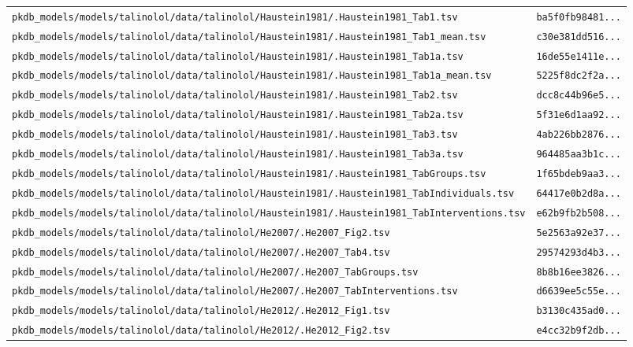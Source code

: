\documentclass{article}
\begin{document}
\begin{longtable}{ll}
\texttt{pkdb\_models/models/talinolol/data/talinolol/Haustein1981/.Haustein1981\_Tab1.tsv} & \texttt{ba5f0fb98481...} \\
\texttt{pkdb\_models/models/talinolol/data/talinolol/Haustein1981/.Haustein1981\_Tab1\_mean.tsv} & \texttt{c30e381dd516...} \\
\texttt{pkdb\_models/models/talinolol/data/talinolol/Haustein1981/.Haustein1981\_Tab1a.tsv} & \texttt{16de55e1411e...} \\
\texttt{pkdb\_models/models/talinolol/data/talinolol/Haustein1981/.Haustein1981\_Tab1a\_mean.tsv} & \texttt{5225f8dc2f2a...} \\
\texttt{pkdb\_models/models/talinolol/data/talinolol/Haustein1981/.Haustein1981\_Tab2.tsv} & \texttt{dcc8c44b96e5...} \\
\texttt{pkdb\_models/models/talinolol/data/talinolol/Haustein1981/.Haustein1981\_Tab2a.tsv} & \texttt{5f31e6d1aa92...} \\
\texttt{pkdb\_models/models/talinolol/data/talinolol/Haustein1981/.Haustein1981\_Tab3.tsv} & \texttt{4ab226bb2876...} \\
\texttt{pkdb\_models/models/talinolol/data/talinolol/Haustein1981/.Haustein1981\_Tab3a.tsv} & \texttt{964485aa3b1c...} \\
\texttt{pkdb\_models/models/talinolol/data/talinolol/Haustein1981/.Haustein1981\_TabGroups.tsv} & \texttt{1f65bdeb9aa3...} \\
\texttt{pkdb\_models/models/talinolol/data/talinolol/Haustein1981/.Haustein1981\_TabIndividuals.tsv} & \texttt{64417e0b2d8a...} \\
\texttt{pkdb\_models/models/talinolol/data/talinolol/Haustein1981/.Haustein1981\_TabInterventions.tsv} & \texttt{e62b9fb2b508...} \\
\texttt{pkdb\_models/models/talinolol/data/talinolol/He2007/.He2007\_Fig2.tsv} & \texttt{5e2563a92e37...} \\
\texttt{pkdb\_models/models/talinolol/data/talinolol/He2007/.He2007\_Tab4.tsv} & \texttt{29574293d4b3...} \\
\texttt{pkdb\_models/models/talinolol/data/talinolol/He2007/.He2007\_TabGroups.tsv} & \texttt{8b8b16ee3826...} \\
\texttt{pkdb\_models/models/talinolol/data/talinolol/He2007/.He2007\_TabInterventions.tsv} & \texttt{d6639ee5c55e...} \\
\texttt{pkdb\_models/models/talinolol/data/talinolol/He2012/.He2012\_Fig1.tsv} & \texttt{b3130c435ad0...} \\
\texttt{pkdb\_models/models/talinolol/data/talinolol/He2012/.He2012\_Fig2.tsv} & \texttt{e4cc32b9f2db...} \\

\end{longtable}
\end{document}

